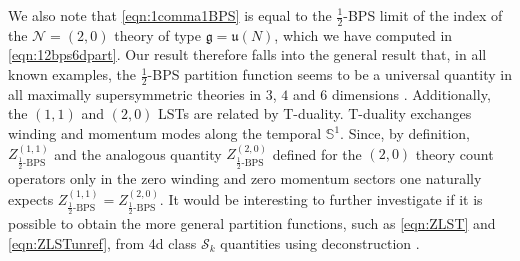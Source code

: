 \documentclass[main.tex]{subfiles}
\begin{document}
We also note that \eqref{eqn:1comma1BPS} is equal to the $\frac{1}{2}$-BPS limit of the index of the $\mathcal{N}=(2,0)$ theory of type $\mathfrak{g}=\mathfrak{u}(N)$, which we have computed in \eqref{eqn:12bps6dpart}. Our result therefore falls into the general result that, in all known examples, the $\frac{1}{2}$-BPS partition function seems to be a universal quantity in all maximally supersymmetric theories in $3$, $4$ and $6$ dimensions \cite{Kim:2016usy}. Additionally, 
the $(1,1)$ and $(2,0)$ LSTs are related by T-duality. T-duality exchanges winding and momentum modes along the temporal $\mathbb{S}^1$. Since, by definition, $Z^{(1,1)}_{\text{$\frac{1}{2}$-BPS}}$ and the analogous quantity $Z^{(2,0)}_{\text{$\frac{1}{2}$-BPS}}$ \cite{Bhattacharyya:2007sa,Kim:2013nva} defined for the $(2,0)$ theory count operators only in the zero winding and zero momentum sectors one naturally expects $Z^{(1,1)}_{\text{$\frac{1}{2}$-BPS}}=Z^{(2,0)}_{\text{$\frac{1}{2}$-BPS}}$.
It would be interesting to further investigate if it is possible to obtain the more general partition functions, such as \eqref{eqn:ZLST} and \eqref{eqn:ZLSTunref}, from 4d class $\mathcal{S}_k$ quantities using deconstruction \cite{Hayling:2017cva,Hayling:2018fmv,Hayling:2018fgy}.
\end{document}
